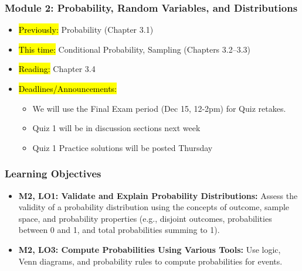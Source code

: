 
\begin{frame}
    \frametitle{Module 2: Probability, Random Variables, and Distributions}
    \begin{itemize}
        \item \hl{Previously: }Probability (Chapter 3.1)
        \item \hl{This time: }Conditional Probability, Sampling (Chapters 3.2--3.3)
        \item \hl{Reading: }Chapter 3.4
        \item \hl{Deadlines/Announcements: }
        \begin{itemize}
            \item We will use the Final Exam period (Dec 15, 12-2pm) for Quiz retakes.
            \item Quiz 1 will be in discussion sections next week
            \item Quiz 1 Practice solutions will be posted Thursday
        \end{itemize}
    \end{itemize}

\end{frame}

\begin{frame}
    \frametitle{Learning Objectives}
    \begin{itemize}
        \item \textbf{M2, LO1: Validate and Explain Probability Distributions:} Assess the validity of a probability distribution using the concepts of outcome, sample space, and probability properties (e.g., disjoint outcomes, probabilities between 0 and 1, and total probabilities summing to 1).
        \item \textbf{M2, LO3: Compute Probabilities Using Various Tools:} Use logic, Venn diagrams, and probability rules to compute probabilities for events.
    \end{itemize}
\end{frame}
